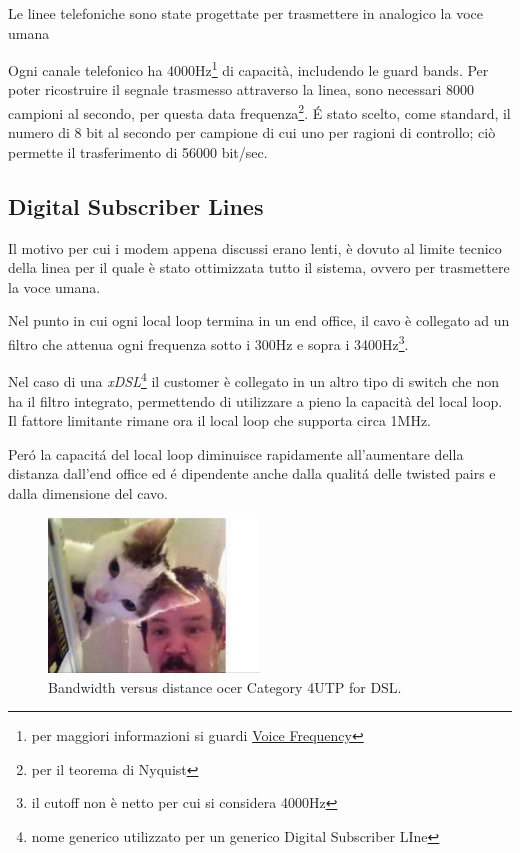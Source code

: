 \documentclass[../ComputerNetworks.tex]{subfiles}
\begin{document}
Le linee telefoniche sono state progettate per trasmettere in analogico la voce umana

Ogni canale telefonico ha 4000Hz\footnote{per maggiori informazioni si guardi \href{https://en.wikipedia.org/wiki/Voice_frequency}{Voice Frequency}} di capacità, includendo le guard bands.
Per poter ricostruire il segnale trasmesso attraverso la linea, sono necessari 8000 campioni al secondo, per questa data frequenza\footnote{per il teorema di Nyquist}.
\'E stato scelto, come standard,  il numero di 8 bit al secondo per campione di cui uno per ragioni di controllo; ciò permette il trasferimento di 56000 bit/sec.

\subsection{Digital Subscriber Lines}

Il motivo per cui i modem appena discussi erano lenti, è dovuto al limite tecnico della linea per il quale è stato ottimizzata tutto il sistema, ovvero per trasmettere la voce umana.

Nel punto in cui ogni local loop termina in un end office, il cavo è collegato ad un filtro che attenua ogni frequenza sotto i 300Hz e sopra i 3400Hz\footnote{il cutoff non è netto per cui si considera 4000Hz}.

Nel caso di una \emph{xDSL}\footnote{nome generico utilizzato per un generico Digital Subscriber LIne} il customer è collegato in un altro tipo di switch che non ha il filtro integrato, permettendo di utilizzare a pieno la capacità del local loop.
Il fattore limitante rimane ora il local loop che supporta circa 1MHz.

Peró la capacitá del local loop diminuisce rapidamente all’aumentare della distanza dall’end office ed é dipendente anche dalla qualitá delle twisted pairs e dalla dimensione del cavo.

\begin{figure}[h]
    \centering
    \includegraphics[width=0.5\textwidth]{img/distance.jpg}
    \caption{Bandwidth versus distance ocer Category 4UTP for DSL.}
\end{figure}
\end{document}
